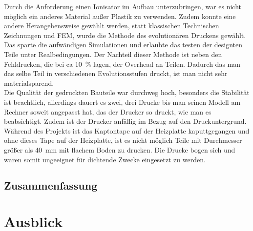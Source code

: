Durch die Anforderung einen Ionisator im Aufbau unterzubringen, war es nicht möglich ein anderes Material außer Plastik zu verwenden. Zudem konnte eine andere Herangehensweise gewählt werden, statt klassischen Technischen Zeichnungen und FEM, wurde die Methode des evolutionären Druckens gewählt. Das sparte die aufwändigen Simulationen und erlaubte das testen der designten Teile unter Realbedingungen. Der Nachteil dieser Methode ist neben den  Fehldrucken, die bei ca \SI{10}{\%} lagen, der Overhead an Teilen. Dadurch das man das selbe Teil in verschiedenen Evolutionsstufen druckt, ist man nicht sehr materialsparend. \\
Die Qualität der gedruckten Bauteile war durchweg hoch, besonders die Stabilität ist beachtlich, allerdings dauert es zwei, drei Drucke bis man seinen Modell am Rechner soweit angepasst hat, das der Drucker so druckt, wie man es beabsichtigt. Zudem ist der Drucker anfällig im Bezug auf den Druckuntergrund. Während des Projekts ist das Kaptontape auf der Heizplatte kaputtgegangen und ohne dieses Tape auf der Heizplatte, ist es nicht möglich Teile mit Durchmesser größer als \SI{40}{mm} mit flachem Boden zu drucken. Die Drucke bogen sich und waren somit ungeeignet für dichtende Zwecke eingesetzt zu werden.


\subsection{Zusammenfassung}








\section{Ausblick}












